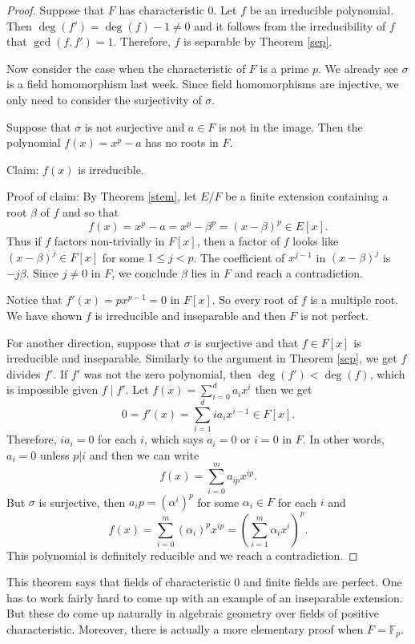 \documentclass[12pt]{report}
\theoremstyle{definition}
\def\FF{\mathbb{F}}
\def\aa{\alpha}
\def\bb{\beta}
\begin{document}
\begin{proof}
    Suppose that $F$ has characteristic 0. Let $f$ be an irreducible polynomial. Then $\deg(f')=\deg(f)-1\not=0$ and it follows from the irreducibility of $f$ that $\gcd(f,f')=1$. Therefore, $f$ is separable by Theorem \ref{sep}.  

    Now consider the case when the characteristic of $F$ is a prime $p$. We already see $\sigma$ is a field homomorphism last week. Since field homomorphisms are injective, we only need to consider the surjectivity  of $\sigma$.

    Suppose that $\sigma$ is not surjective and $a\in F$ is not in the image. Then the polynomial $f(x)=x^p-a$ has no roots in $F$. 
    
    Claim: $f(x)$ is irreducible.

    Proof of claim: By Theorem \ref{stem}, let $E/F$ be a finite extension containing a root $\bb$ of $f$ and so that $$f(x)=x^p-a=x^p-\bb^p=(x-\bb)^p \in E[x].$$
    Thus if $f$ factors non-trivially in $F[x]$, then a factor of $f$ looks like $(x-\bb)^j \in F[x]$ for some $1\leq j<p$. The coefficient of $x^{j-1}$ in $(x-\bb)^j$ is $-j\bb$. Since $j\not=0$ in $F$, we conclude $\bb$ lies in $F$ and reach a contradiction. 

    Notice that $f'(x)=px^{p-1} = 0$ in $F[x]$. So every root of $f$ is a multiple root. We have shown $f$ is irreducible and inseparable and then $F$ is not perfect.
    
    For another direction, suppose that $\sigma$ is surjective and that $f\in F[x]$ is irreducible and inseparable. Similarly to the argument in Theorem \ref{sep}, we get $f$ divides $f'$. If $f'$ was not the zero polynomial, then $\deg(f')< \deg(f)$, which is impossible given $f\mid f'$. Let $f(x)=\sum_{i=0}^d a_ix^i$ then we get $$0=f'(x)=\sum_{i=1}^dia_ix^{i-1}\in F[x].$$  Therefore, $ia_i=0$ for each $i$, which says $a_i=0$ or $i=0$ in $F$. In other words, $a_i=0$ unless $p|i$ and then we can write $$f(x)= \sum_{i=0}^m a_{ip}x^{ip}.$$ But $\sigma$ is surjective, then $a_ip =  (\aa^i)^p$ for some $\aa_i\in F$ for each $i$ and $$f(x) =  \sum_{i=0}^m (\aa_i)^p x^{ip} = (\sum_{i=1}^m \aa_ix^i)^p.$$ This polynomial is definitely reducible and we reach a contradiction.
\end{proof}


This theorem says that fields of characteristic 0 and finite fields are perfect. One has to work fairly hard to come up with an example of an inseparable extension. But these do come up naturally in algebraic geometry over fields of positive characteristic. Moreover, there is actually a  more elementary proof when $F=\FF_p$.
\end{document}
